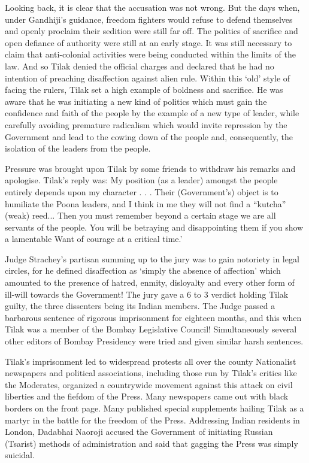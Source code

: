 Looking back, it is clear that the accusation was not wrong. But the days when, under Gandhiji’s guidance, freedom fighters would refuse to defend themselves and openly proclaim their sedition were still far off. The politics of sacrifice and open defiance of authority were still at an early stage. It was still necessary to claim that anti-colonial activities were being conducted within the limits of the law. And so Tilak denied the official charges and declared that he had no intention of preaching disaffection against alien rule. Within this ‘old’ style of facing the rulers, Tilak set a high example of boldness and sacrifice. He was aware that he was initiating a new kind of politics which must gain the confidence and faith of the people by the example of a new type of leader, while carefully avoiding premature radicalism which would invite repression by the Government and lead to the cowing down of the people and, consequently, the isolation of the leaders from the people.

Pressure was brought upon Tilak by some friends to withdraw his remarks and apologise. Tilak’s reply was: My position (as a leader) amongst the people entirely depends upon my character . . . Their (Government’s) object is to humiliate the Poona leaders, and I think in me they will not find a “kutcha” (weak) reed... Then you must remember beyond a certain stage we are all servants of the people. You will be betraying and disappointing them if you show a lamentable Want of courage at a critical time.’

Judge Strachey’s partisan summing up to the jury was to gain notoriety in legal circles, for he defined disaffection as ‘simply the absence of affection’ which amounted to the presence of hatred, enmity, disloyalty and every other form of ill-will towards the Government! The jury gave a 6 to 3 verdict holding Tilak guilty, the three dissenters being its Indian members. The Judge passed a barbarous sentence of rigorous imprisonment for eighteen months, and this when Tilak was a member of the Bombay Legislative Council! Simultaneously several other editors of Bombay Presidency were tried and given similar harsh sentences.

Tilak’s imprisonment led to widespread protests all over the county Nationalist newspapers and political associations, including those run by Tilak’s critics like the Moderates, organized a countrywide movement against this attack on civil liberties and the fiefdom of the Press. Many newspapers came out with black borders on the front page. Many published special supplements hailing Tilak as a martyr in the battle for the freedom of the Press. Addressing Indian residents in London, Dadabhai Naoroji accused the Government of initiating Russian (Tsarist) methods of administration and said that gagging the Press was simply suicidal.

